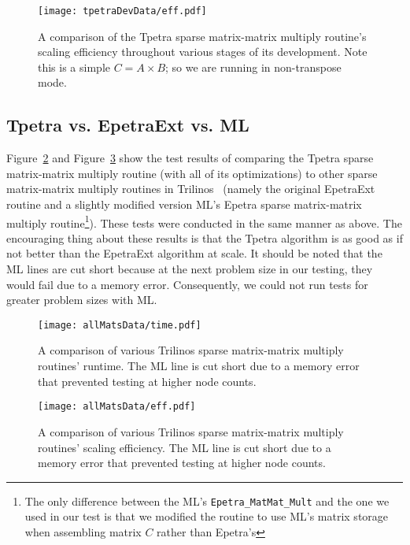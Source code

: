 \documentclass[pdf,12pt]{SANDreport}
\begin{document}
\begin{figure}
\centering
\texttt{[image: tpetraDevData/eff.pdf]}
\caption[Tpetra Development Efficiency Comparison]{A comparison of the Tpetra sparse matrix-matrix multiply routine's 
scaling efficiency
throughout various stages of its development. Note this is a simple $C=A \times B$; so we are running in non-transpose mode.}
\label{tpetracompeff}
\end{figure}


\subsection{Tpetra vs. EpetraExt vs. ML}
Figure~\ref{alltime} and Figure~\ref{alleff} show the test results of comparing the Tpetra sparse matrix-matrix multiply 
routine (with all of its optimizations) to other sparse matrix-matrix multiply routines in Trilinos~\cite{1089021} 
(namely the original 
EpetraExt routine and a slightly modified version ML's Epetra sparse matrix-matrix multiply 
routine\footnote{The only difference 
between the ML's \verb!Epetra_MatMat_Mult! and the one we used in our test is that we modified the routine to use ML's
matrix storage when assembling matrix $C$ rather than Epetra's}). 
These tests were conducted in the same manner as above. 
The encouraging thing about these results is that the Tpetra algorithm is as good as if not better than the EpetraExt 
algorithm at scale. It should be noted that the ML lines are cut short because at the next problem size in our testing, 
they would fail due to a memory error. Consequently, we could not run tests for greater problem sizes with ML. 

\begin{figure}
\centering
\texttt{[image: allMatsData/time.pdf]}
\caption[All Algorithms Time Comparison]{A comparison of various Trilinos sparse matrix-matrix multiply routines' runtime. 
The ML line is cut short due to a memory error that prevented testing at higher node counts.}
\label{alltime}
\end{figure}

\begin{figure}
\centering
\texttt{[image: allMatsData/eff.pdf]}
\caption[All Algorithms Efficiency Comparison]{A comparison of various Trilinos sparse matrix-matrix multiply routines' 
scaling efficiency. The ML line is cut short due to a memory error that prevented testing at higher node counts.}
\label{alleff}
\end{figure}
\end{document}
